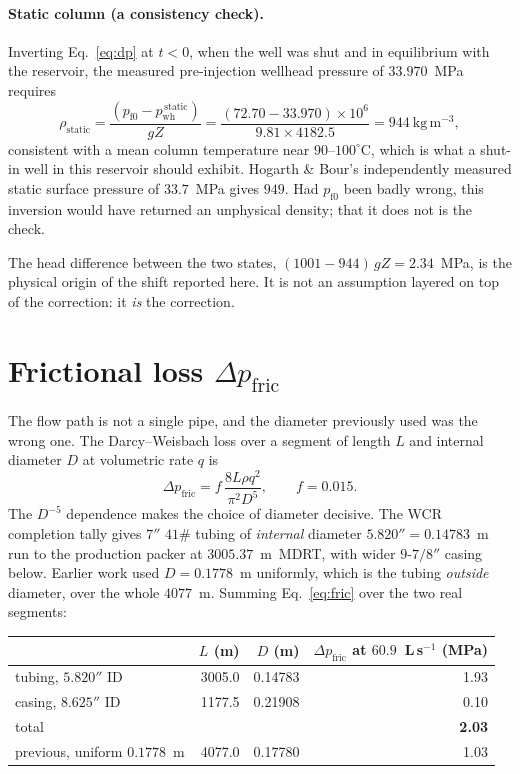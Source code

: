 \documentclass[11pt]{article}
\newcommand{\pfz}{p_{\mathrm{f}0}}
\newcommand{\pwh}{p_{\mathrm{wh}}}
\begin{document}
\paragraph{Static column (a consistency check).}
Inverting Eq.~\eqref{eq:dp} at $t<0$, when the well was shut and in equilibrium
with the reservoir, the measured pre-injection wellhead pressure of
$33.970$~MPa requires
\begin{equation}
  \rho_{\mathrm{static}}
  = \frac{\left(\pfz - \pwh^{\,\mathrm{static}}\right)}{g Z}
  = \frac{(72.70 - 33.970)\times 10^{6}}{9.81 \times 4182.5}
  = 944~\mathrm{kg\,m^{-3}},
\end{equation}
consistent with a mean column temperature near $90$--$100^\circ$C, which is
what a shut-in well in this reservoir should exhibit. Hogarth \& Bour's
independently measured static surface pressure of $33.7$~MPa gives $949$. Had
$\pfz$ been badly wrong, this inversion would have returned an unphysical
density; that it does not is the check.

The head difference between the two states,
$(1001-944)\,g Z = 2.34$~MPa, is the physical origin of the shift reported
here. It is not an assumption layered on top of the correction: it \emph{is}
the correction.

\section{Frictional loss $\Delta p_{\mathrm{fric}}$}

The flow path is not a single pipe, and the diameter previously used was the
wrong one. The Darcy--Weisbach loss over a segment of length $L$ and internal
diameter $D$ at volumetric rate $q$ is
\begin{equation}
  \Delta p_{\mathrm{fric}} = f\,\frac{8 L \rho q^{2}}{\pi^{2} D^{5}},
  \qquad f = 0.015 .
  \label{eq:fric}
\end{equation}
The $D^{-5}$ dependence makes the choice of diameter decisive. The WCR
\cite{wcr} completion tally gives $7''$ $41\#$ tubing of \emph{internal}
diameter $5.820'' = 0.14783$~m run to the production packer at
$3005.37$~m~MDRT, with wider $9\text{-}7/8''$ casing below. Earlier work used
$D = 0.1778$~m uniformly, which is the tubing \emph{outside} diameter, over the
whole $4077$~m. Summing Eq.~\eqref{eq:fric} over the two real segments:

\begin{center}
\begin{tabular}{lrrr}
  \toprule
  & $L$ (m) & $D$ (m) & $\Delta p_{\mathrm{fric}}$ at $60.9$~L\,s$^{-1}$ (MPa) \\
  \midrule
  tubing, $5.820''$ ID   & 3005.0 & 0.14783 & 1.93 \\
  casing, $8.625''$ ID   & 1177.5 & 0.21908 & 0.10 \\
  \midrule
  total                  &        &         & \textbf{2.03} \\
  previous, uniform $0.1778$~m & 4077.0 & 0.17780 & 1.03 \\
  \bottomrule
\end{tabular}
\end{center}
\end{document}
